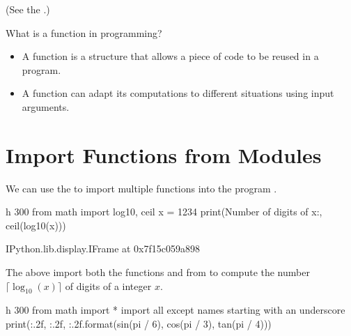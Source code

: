 \documentclass[letterpaper,10pt,english]{sphinxmanual}
\begin{document}
(See the .)

 What is a function in programming?
\begin{itemize}
\item {} 
A function is a structure that allows a piece of code to be reused in a program.

\item {} 
A function can adapt its computations to different situations using input arguments.

\end{itemize}


\section{Import Functions from Modules}
\label{\detokenize{Lecture4/Using Functions:import-functions-from-modules}}

We can use the  to import multiple functions into the program .

\begin{sphinxVerbatim}[commandchars=\\\{\}]
 \PYGZhy{}h 300
from math import log10, ceil
x = 1234
print(\PYGZsq{}Number of digits of x:\PYGZsq{}, ceil(log10(x)))
\end{sphinxVerbatim}

\begin{sphinxVerbatim}[commandchars=\\\{\}]
\PYGZlt{}IPython.lib.display.IFrame at 0x7f15c059a898\PYGZgt{}
\end{sphinxVerbatim}

The above import both the functions  and  from  to compute the number \(\lceil \log_{10}(x)\rceil\) of digits of a  integer \(x\).


\begin{sphinxVerbatim}[commandchars=\\\{\}]
 \PYGZhy{}h 300
from math import *  \PYGZsh{} import all except names starting with an underscore
print(\PYGZsq{}\PYGZob{}:.2f\PYGZcb{}, \PYGZob{}:.2f\PYGZcb{}, \PYGZob{}:.2f\PYGZcb{}\PYGZsq{}.format(sin(pi / 6), cos(pi / 3), tan(pi / 4)))
\end{sphinxVerbatim}
\end{document}
